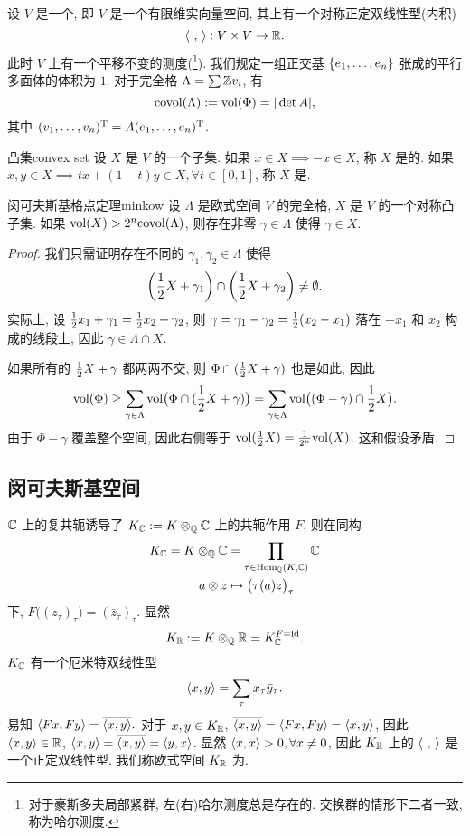设 $V$ 是一个, 即 $V$ 是一个有限维实向量空间, 其上有一个对称正定双线性型(内积)
	\[\langle{\ ,\ }\rangle: V\times V\to {\mathbb{R}}.\]
此时 $V$ 上有一个平移不变的测度(\footnote{对于豪斯多夫局部紧群, 左(右)哈尔测度总是存在的. 交换群的情形下二者一致, 称为哈尔测度.}). 我们规定一组正交基 $\left\{e_1,\dots,e_n\right\}$ 张成的平行多面体的体积为 $1$.
对于完全格 $\Lambda=\sum {\mathbb{Z}} v_i$, 有
	\[{\mathrm{covol}}(\Lambda):={\mathrm{vol}}(\Phi)=|\det A|,\]
其中 $(v_1,\dots,v_n)^{\mathrm{T}}=A(e_1,\dots,e_n)^{\mathrm{T}}$.

\begin{definition}{凸集}{convex set}
设 $X$ 是 $V$ 的一个子集. 如果 $x\in X\implies -x\in X$, 称 $X$ 是的. 如果 $x,y\in X\implies tx+(1-t)y\in X,\forall t\in [0,1]$, 称 $X$ 是.
\end{definition}

\begin{theorem}{闵可夫斯基格点定理}{minkow}
设 $\Lambda$ 是欧式空间 $V$ 的完全格, $X$ 是 $V$ 的一个对称凸子集. 如果 ${\mathrm{vol}}(X)>2^n{\mathrm{covol}}(\Lambda)$, 则存在非零 $\gamma\in\Lambda$ 使得 $\gamma\in X$.
\end{theorem}
\begin{proof}
我们只需证明存在不同的 $\gamma_1,\gamma_2\in\Lambda$ 使得
	\[\left(\frac{1}{2} X+\gamma_1\right)\cap \left(\frac{1}{2} X+\gamma_2\right)\neq \emptyset.\]
实际上, 设 $\frac{1}{2} x_1+\gamma_1=\frac{1}{2} x_2+\gamma_2$, 则 $\gamma=\gamma_1-\gamma_2=\frac{1}{2}(x_2-x_1)$ 落在 $-x_1$ 和 $x_2$ 构成的线段上, 因此 $\gamma\in \Lambda\cap X$.

如果所有的 $\frac{1}{2} X+\gamma$ 都两两不交, 则 $\Phi\cap (\frac{1}{2} X+\gamma)$ 也是如此, 因此
	\[{\mathrm{vol}}(\Phi)\ge \sum_{\gamma\in \Lambda} {\mathrm{vol}}\bigl(\Phi\cap (\frac{1}{2} X+\gamma)\bigr)=\sum_{\gamma\in \Lambda} {\mathrm{vol}}\bigl((\Phi-\gamma)\cap \frac{1}{2} X\bigr).\]
由于 $\Phi-\gamma$ 覆盖整个空间, 因此右侧等于 ${\mathrm{vol}}(\frac{1}{2} X)=\frac{1}{2^n}{\mathrm{vol}}(X)$. 这和假设矛盾.
\end{proof}


\subsection{闵可夫斯基空间}
${\mathbb{C}}$ 上的复共轭诱导了 $K_{\mathbb{C}}:=K\otimes_{\mathbb{Q}} {\mathbb{C}}$ 上的共轭作用 $F$, 则在同构
	\[\begin{split}
	K_{\mathbb{C}}=K\otimes_{\mathbb{Q}} {\mathbb{C}}&=\prod_{\tau\in{\mathrm{Hom}}_{\mathbb{Q}}(K,{\mathbb{C}})} {\mathbb{C}}\\
	a\otimes z&\mapsto \bigl(\tau(a)z\bigr)_\tau
	\end{split}\]
下, $F\bigl((z_\tau)_\tau\bigr)=(\bar z_{\bar \tau})_\tau$. 显然
	\[K_{\mathbb{R}}:=K\otimes_{\mathbb{Q}} {\mathbb{R}}=K_{\mathbb{C}}^{F={\mathrm{id}}}.\]
$K_{\mathbb{C}}$ 有一个厄米特双线性型
	\[\langle{x,y}\rangle=\sum_\tau x_\tau\bar y_\tau.\]
易知 $\langle{Fx,Fy}\rangle=\overline{\langle{x,y}\rangle}.$ 对于 $x,y\in K_{\mathbb{R}}$, $\overline{\langle{x,y}\rangle}=\langle{Fx,Fy}\rangle=\langle{x,y}\rangle$, 因此 $\langle{x,y}\rangle\in{\mathbb{R}}$, $\langle{x,y}\rangle=\overline{\langle{x,y}\rangle}=\langle{y,x}\rangle$. 显然 $\langle{x,x}\rangle>0,\forall x\neq 0$, 因此 $K_{\mathbb{R}}$ 上的 $\langle{~,~}\rangle$ 是一个正定双线性型. 我们称欧式空间 $K_{\mathbb{R}}$ 为. 

